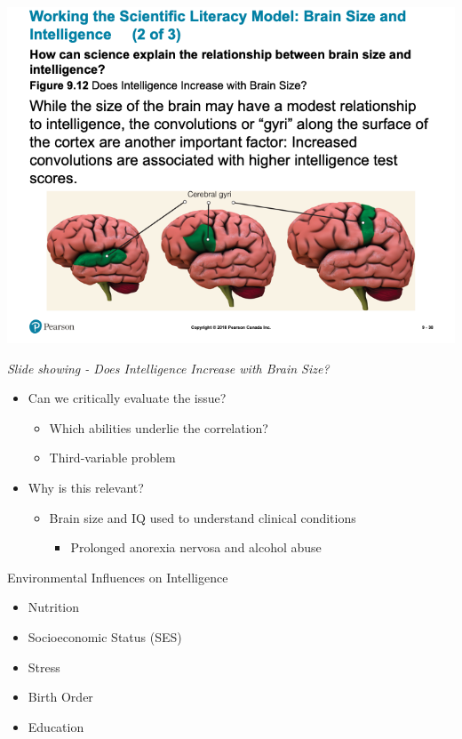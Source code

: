 \documentclass[
]{book}
\providecommand{\tightlist}{%
  \setlength{\itemsep}{0pt}\setlength{\parskip}{0pt}}
\begin{document}
\begin{reflect}
\includegraphics{assets/unit_2/slide_38.png}

\emph{Slide showing - Does Intelligence Increase with Brain Size?}

\begin{itemize}
\tightlist
\item
  Can we critically evaluate the issue?

  \begin{itemize}
  \tightlist
  \item
    Which abilities underlie the correlation?\\
  \item
    Third-variable problem
  \end{itemize}
\item
  Why is this relevant?

  \begin{itemize}
  \tightlist
  \item
    Brain size and IQ used to understand clinical conditions

    \begin{itemize}
    \tightlist
    \item
      Prolonged anorexia nervosa and alcohol abuse
    \end{itemize}
  \end{itemize}
\end{itemize}

Environmental Influences on Intelligence

\begin{itemize}
\tightlist
\item
  Nutrition\\
\item
  Socioeconomic Status (SES)\\
\item
  Stress\\
\item
  Birth Order\\
\item
  Education
\end{itemize}


\end{reflect}
\end{document}
